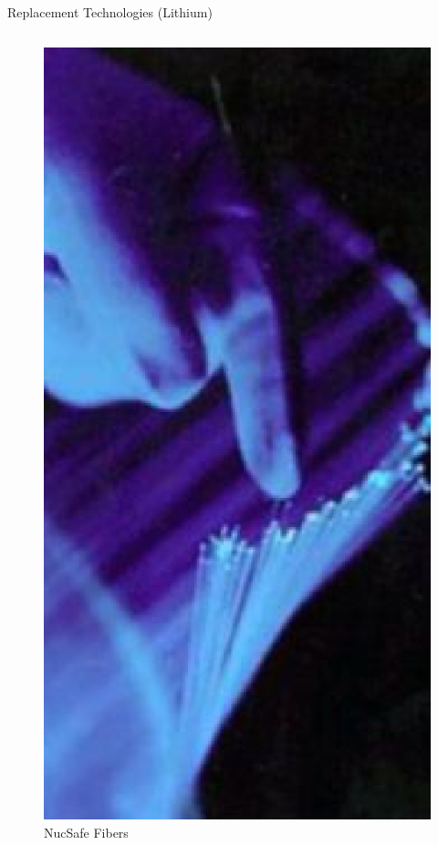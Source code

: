 \begin{frame}{Replacement Technologies (Lithium)}
\begin{columns}[onlytextwidth]
\begin{column}{0.45\textwidth}
\begin{figure}
		\includegraphics[height=0.25\textheight]{images/NucSafeFibers.eps}
		\caption{NucSafe Fibers}
		\label{fig:NucSafeFibers}
	\end{figure}
\end{column}
\end{columns}
\end{frame}
